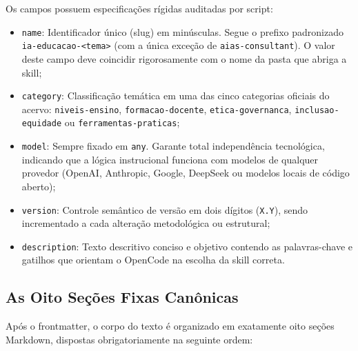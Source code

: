 Os campos possuem especifica{\c c}{\~o}es r{\'i}gidas auditadas por script:
\begin{itemize}
  \item \texttt{name}: Identificador {\'u}nico (slug) em min{\'u}sculas. Segue o prefixo padronizado \texttt{ia-educacao-<tema>} (com a {\'u}nica exce{\c c}{\~a}o de \texttt{aias-consultant}). O valor deste campo deve coincidir rigorosamente com o nome da pasta que abriga a skill;
  \item \texttt{category}: Classifica{\c c}{\~a}o temática em uma das cinco categorias oficiais do acervo: \texttt{niveis-ensino}, \texttt{formacao-docente}, \texttt{etica-governanca}, \texttt{inclusao-equidade} ou \texttt{ferramentas-praticas};
  \item \texttt{model}: Sempre fixado em \texttt{any}. Garante total independ{\^e}ncia tecnol{\'o}gica, indicando que a l{\'o}gica instrucional funciona com modelos de qualquer provedor (OpenAI, Anthropic, Google, DeepSeek ou modelos locais de c{\'o}digo aberto);
  \item \texttt{version}: Controle sem{\^a}ntico de vers{\~a}o em dois d{\'i}gitos (\texttt{X.Y}), sendo incrementado a cada altera{\c c}{\~a}o metodol{\'o}gica ou estrutural;
  \item \texttt{description}: Texto descritivo conciso e objetivo contendo as palavras-chave e gatilhos que orientam o OpenCode na escolha da skill correta.
\end{itemize}

\subsection{As Oito Se{\c c}{\~o}es Fixas Can{\^o}nicas}

Ap{\'o}s o frontmatter, o corpo do texto {\'e} organizado em exatamente oito se{\c c}{\~o}es Markdown, dispostas obrigatoriamente na seguinte ordem:

